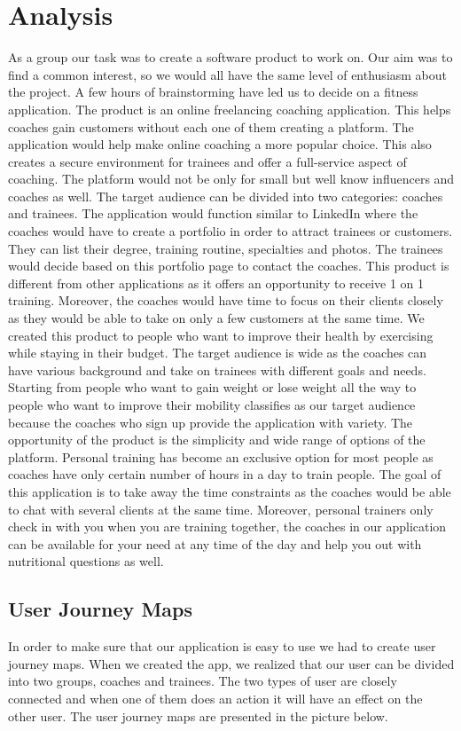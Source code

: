 \section{Analysis}

As a group our task was to create a software product to work on. Our aim was to find a common interest, so we would all have the same level of enthusiasm about the project. A few hours of brainstorming have led us to decide on a fitness application. 
The product is an online freelancing coaching application. This helps coaches gain customers without each one of them creating a platform. The application would help make online coaching a more popular choice. This also creates a secure environment for trainees and offer a full-service aspect of coaching. The platform would not be only for small but well know influencers and coaches as well. The target audience can be divided into two categories: coaches and trainees. The application would function similar to LinkedIn where the coaches would have to create a portfolio in order to attract trainees or customers. They can list their degree, training routine, specialties and photos. The trainees would decide based on this portfolio page to contact the coaches.
This product is different from other applications as it offers an opportunity to receive 1 on 1 training. Moreover, the coaches would have time to focus on their clients closely as they would be able to take on only a few customers at the same time.
We created this product to people who want to improve their health by exercising while staying in their budget. The target audience is wide as the coaches can have various background and take on trainees with different goals and needs. Starting from people who want to gain weight or lose weight all the way to people who want to improve their mobility classifies as our target audience because the coaches who sign up provide the application with variety.
The opportunity of the product is the simplicity and wide range of options of the platform. Personal training has become an exclusive option for most people as coaches have only certain number of hours in a day to train people. The goal of this application is to take away the time constraints as the coaches would be able to chat with several clients at the same time. Moreover, personal trainers only check in with you when you are training together, the coaches in our application can be available for your need at any time of the day and help you out with nutritional questions as well.

\subsection{User Journey Maps}
\label{sec:UserJourneyMaps}
In order to make sure that our application is easy to use we had to create user journey maps. When we created the app, we realized that our user can be divided into two groups, coaches and trainees. The two types of user are closely connected and when one of them does an action it will have an effect on the other user. The user journey maps are presented in the picture below.

